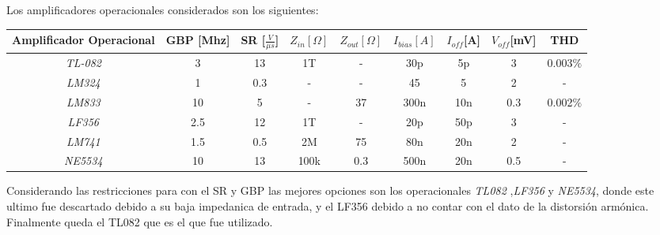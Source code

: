 Los amplificadores operacionales considerados son los siguientes:
\begin{table}[H]
\centering
\begin{tabular}{ccccccccc}
\textbf{Amplificador Operacional} & \textbf{GBP [Mhz]} & \textbf{SR [$\frac{V}{\mu s}$]} & \textbf{$Z_{in} [\Omega]$} & \textbf{$Z_{out}[\Omega]$} & \textbf{$I_{bias}[A]$} & \textbf{$I_{off}$[A]} & \textbf{$V_{off}$[mV]} & \textbf{THD} \\ \hline
\textit{TL-082}                   & 3                  & 13                              & 1T                         & -                          & 30p                 & 5p                    & 3                      & 0.003$\%$    \\
\textit{LM324}                    & 1                  & 0.3                             & -                          & -                          & 45                  & 5                     & 2                      & -            \\
\textit{LM833}                    & 10                 & 5                               & -                          & 37                         & 300n                & 10n                   & 0.3                    & 0.002$\%$    \\
\textit{LF356}                    & 2.5                & 12                              & 1T                         & -                          & 20p                 & 50p                   & 3                      & -            \\
\textit{LM741}                    & 1.5                & 0.5                             & 2M                         & 75                         & 80n                 & 20n                   & 2                      & -            \\
\textit{NE5534}                   & 10                 & 13                              & 100k                       & 0.3                        & 500n                & 20n                   & 0.5                    & -           
\end{tabular}
\end{table}
Considerando las restricciones para con el SR y GBP las mejores opciones son los operacionales \emph{TL082} ,\emph{LF356} y \emph{NE5534}, donde este ultimo fue descartado debido a su baja impedanica de entrada, y el LF356 debido a no contar con el dato de la distorsión armónica.
Finalmente queda el TL082 que es el que fue utilizado.

